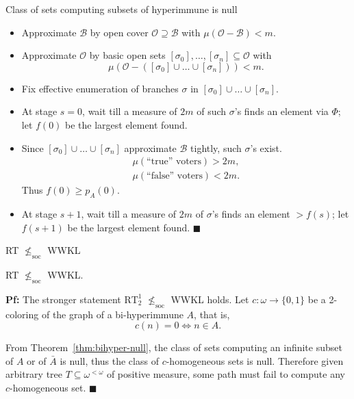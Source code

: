 \begin{frame}{Class of sets computing subsets of hyperimmune is null}
  \begin{itemize}
    \item Approximate $\mathcal{B}$ by open cover
      $\mathcal{O}\supseteq\mathcal{B}$ with
      $\mu(\mathcal{O}-\mathcal{B})<m$.
    \item Approximate $\mathcal{O}$ by basic open sets
      $[\sigma_0],\ldots,[\sigma_n] \subseteq\mathcal{O}$ with
      \[\mu(\mathcal{O}-([\sigma_0]\cup\ldots\cup[\sigma_n])) <m.\]
    \item Fix effective enumeration of branches $\sigma$ in
      $[\sigma_0]\cup\ldots\cup[\sigma_n]$.
    \item At stage $s=0$, wait till a measure of $2m$ of such $\sigma$'s
      finds an element via $\Phi$; let $f(0)$ be the largest element found.
    \item Since $[\sigma_0]\cup\ldots\cup[\sigma_n]$ approximate
      $\mathcal{B}$ tightly, such $\sigma$'s exist.
      \begin{align*}
        \mu(\text{``true'' voters})>2m,\\
        \mu(\text{``false'' voters})<2m.
      \end{align*}
      Thus $f(0)\geq p_A(0)$.
    \item At stage $s+1$, wait till a measure of $2m$ of $\sigma$'s
      finds an element $>f(s)$; let $f(s+1)$ be the largest
      element found. $\blacksquare$
  \end{itemize}
\end{frame}

\begin{frame}{RT $\nleq_{\text{soc}}$ WWKL}
  \begin{thm}
    RT $\nleq_{\text{soc}}$ WWKL.
  \end{thm}

  \vspace{1em}
  \textbf{Pf:} The stronger statement $\text{RT}_2^1$ $\nleq_{\text{soc}}$
  WWKL holds. Let $c:\omega\rightarrow\{0,1\}$ be a 2-coloring of the graph
  of a bi-hyperimmune $A$, that is,
  \[c(n)=0 \Leftrightarrow n\in A.\]
  
  From Theorem~\ref{thm:bihyper-null}, the class of sets computing an
  infinite subset of $A$ or of $\bar{A}$ is null, thus the class of
  $c$-homogeneous sets is null. Therefore given arbitrary tree
  $T\subseteq\omega^{<\omega}$ of positive measure, some path must fail to
  compute any $c$-homogeneous set. $\blacksquare$
\end{frame}
